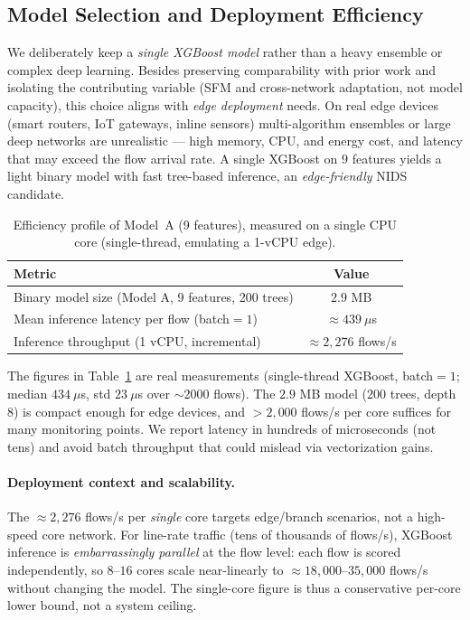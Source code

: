 \documentclass[preprint,12pt,authoryear]{elsarticle}
\begin{document}
\subsection{Model Selection and Deployment Efficiency}
\label{sec:edge}
We deliberately keep a \emph{single XGBoost model} rather than a heavy ensemble
or complex deep learning. Besides preserving comparability with prior work and
isolating the contributing variable (SFM and cross-network adaptation, not model
capacity), this choice aligns with \emph{edge deployment} needs. On real edge
devices (smart routers, IoT gateways, inline sensors) multi-algorithm ensembles or
large deep networks are unrealistic --- high memory, CPU, and energy cost, and
latency that may exceed the flow arrival rate. A single XGBoost on $9$ features
yields a light binary model with fast tree-based inference, an \emph{edge-friendly}
NIDS candidate.

\begin{table}[!ht]
\centering
\caption{Efficiency profile of Model~A (9 features), measured on a single CPU
core (single-thread, emulating a 1-vCPU edge).}
\label{tab:efficiency}
\begin{tabular}{lc}
\toprule
Metric & Value \\
\midrule
Binary model size (Model A, 9 features, 200 trees) & $2.9$ MB \\
Mean inference latency per flow (batch$=1$) & $\approx 439\ \mu$s \\
Inference throughput (1 vCPU, incremental) & $\approx 2{,}276$ flows/s \\
\bottomrule
\end{tabular}
\end{table}

\noindent The figures in Table~\ref{tab:efficiency} are real measurements
(single-thread XGBoost, batch$=1$; median $434\ \mu$s, std $23\ \mu$s over
$\sim$2000 flows). The $2.9$ MB model (200 trees, depth 8) is compact enough for
edge devices, and $>2{,}000$ flows/s per core suffices for many monitoring points.
We report latency in hundreds of microseconds (not tens) and avoid batch throughput
that could mislead via vectorization gains.

\paragraph{Deployment context and scalability.} The $\approx 2{,}276$ flows/s per
\emph{single} core targets edge/branch scenarios, not a high-speed core network.
For line-rate traffic (tens of thousands of flows/s), XGBoost inference is
\emph{embarrassingly parallel} at the flow level: each flow is scored
independently, so $8$--$16$ cores scale near-linearly to
$\approx 18{,}000$--$35{,}000$ flows/s without changing the model. The single-core
figure is thus a conservative per-core lower bound, not a system ceiling.
\end{document}
